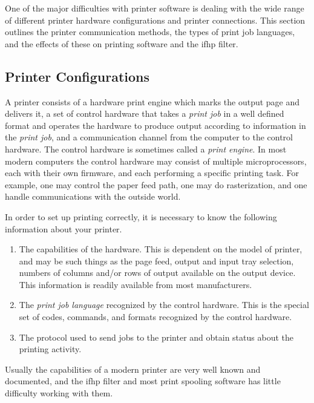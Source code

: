 \documentclass[a4paper]{article}
\begin{document}
One of the major difficulties with printer software
is dealing with the wide range of different printer hardware configurations
and printer connections.
This section outlines the printer communication methods,
the types of print job languages,
and the effects of these on printing software and the {\ttfamily ifhp}
filter.


\subsection{Printer Configurations}

A printer consists of a hardware print engine which marks the output page
and delivers it,
a set of control hardware that takes a {\itshape print job\/}
in a well defined format and operates the hardware to produce output
according to information in the {\itshape print job\/},
and a communication channel from the computer to the control hardware.
The control hardware is sometimes called a {\itshape print engine\/}.
In most modern computers the control hardware may consist of multiple microprocessors,
each with their own firmware,
and each performing a specific printing task.
For example,
one may control the paper feed path,
one may do rasterization,
and one handle communications with the outside world.

In order to set up printing correctly,
it is necessary to know the following information about your printer.
\begin{enumerate}
\item The capabilities of the hardware.
This is dependent on the model of printer,
and may be such things as the page feed,
output and input tray selection,
numbers of columns and/or rows of output available on the output device.
This information is readily available from most manufacturers.
\item The {\itshape print job language\/}
recognized by the control hardware.
This is the special set of codes,
commands, and formats recognized by the control hardware.
\item The protocol used to send jobs to the printer and obtain status
about the printing activity.
\end{enumerate}


Usually the capabilities of a modern printer are very well known
and documented,
and the {\ttfamily ifhp} filter and most print spooling software has
little difficulty working with them.
\end{document}
